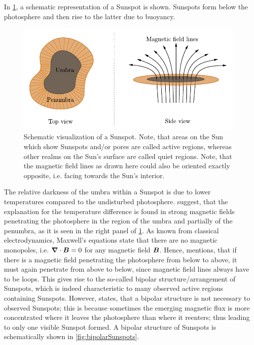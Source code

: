 \documentclass[a4paper,12pt]{report}
\begin{document}
In \cref{fig:Sunspotsschematic}, a schematic representation of a Sunspot is shown. Sunspots form below the photosphere and then rise to the latter due to buoyancy.
\begin{figure}[h]
\centering
\includegraphics[width=\textwidth-2cm]{figures/Sunspotsschematic.pdf}
\caption{Schematic visualization of a Sunspot. Note, that areas on the Sun which show Sunspots and/or pores are called active regions, whereas other realms on the Sun's surface are called quiet regions. Note, that the magnetic field lines as drawn here could also be oriented exactly opposite, i.e. facing towards the Sun's interior.}
\label{fig:Sunspotsschematic}
\end{figure}
The relative darkness of the umbra within a Sunspot is due to lower temperatures compared to the undisturbed photosphere. \cite[p.142]{Weigert.2006} suggest, that the explanation for the temperature difference is found in strong magnetic fields penetrating the photosphere in the region of the umbra and partially of the penumbra, as it is seen in the right panel of \cref{fig:Sunspotsschematic}. As known from classical electrodynamics, Maxwell's equations state that there are no magnetic monopoles, i.e. $\bm{\nabla}\cdot \bm{B} = 0$ for any magnetic field $\bm{B}$. Hence, \cite[p.342]{Stix.2002} mentions, that if there is a magnetic field penetrating the photosphere from below to above, it must again penetrate from above to below, since magnetic field lines always have to be loops. This gives rise to the so-called bipolar structure/arrangement of Sunspots, which is indeed characteristic to many observed active regions containing Sunspots. However, \cite[p.342]{Stix.2002} states, that a bipolar structure is not necessary to observed Sunspots; this is because sometimes the emerging magnetic flux is more concentrated where it leaves the photosphere than where it reenters; thus leading to only one visible Sunspot formed. A bipolar structure of Sunspots is schematically shown in \cref{fig:bipolarSunspots}.
\end{document}
